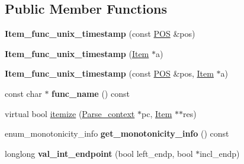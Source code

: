 \subsection*{Public Member Functions}
\begin{DoxyCompactItemize}
\item 
\mbox{\label{classItem__func__unix__timestamp_a4a8e6464420e5da507a767a097e9548c}} 
{\bfseries Item\+\_\+func\+\_\+unix\+\_\+timestamp} (const \mbox{\hyperlink{structYYLTYPE}{P\+OS}} \&pos)
\item 
\mbox{\label{classItem__func__unix__timestamp_aaeefeed3f5e0cbae2062bd493a59e2e3}} 
{\bfseries Item\+\_\+func\+\_\+unix\+\_\+timestamp} (\mbox{\hyperlink{classItem}{Item}} $\ast$a)
\item 
\mbox{\label{classItem__func__unix__timestamp_ac5171bc8ab2528e74bc896986f71e476}} 
{\bfseries Item\+\_\+func\+\_\+unix\+\_\+timestamp} (const \mbox{\hyperlink{structYYLTYPE}{P\+OS}} \&pos, \mbox{\hyperlink{classItem}{Item}} $\ast$a)
\item 
\mbox{\label{classItem__func__unix__timestamp_a0ffa4380b7f558a9a49297d20ace9f2e}} 
const char $\ast$ {\bfseries func\+\_\+name} () const
\item 
virtual bool \mbox{\hyperlink{classItem__func__unix__timestamp_a6fd7748e77da5e602a452ad49dfe4bbc}{itemize}} (\mbox{\hyperlink{structParse__context}{Parse\+\_\+context}} $\ast$pc, \mbox{\hyperlink{classItem}{Item}} $\ast$$\ast$res)
\item 
\mbox{\label{classItem__func__unix__timestamp_a5ee9d3147c72cb02918b3181fae7427a}} 
enum\+\_\+monotonicity\+\_\+info {\bfseries get\+\_\+monotonicity\+\_\+info} () const
\item 
\mbox{\label{classItem__func__unix__timestamp_a04834fb09e813acf287de7a9b6e813c2}} 
longlong {\bfseries val\+\_\+int\+\_\+endpoint} (bool left\+\_\+endp, bool $\ast$incl\+\_\+endp)
\item 
\mbox{\label{classItem__func__unix__timestamp_ab3c3a760068e25740fcb74726206d6fa}} 
$$
\end{DoxyCompactItemize}
